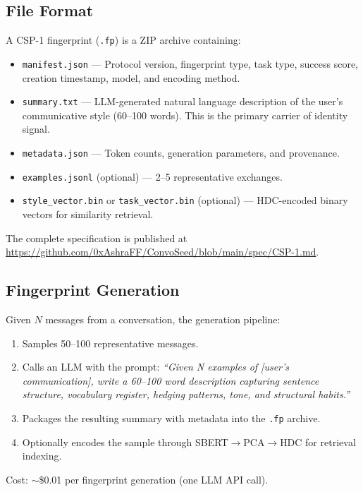 \documentclass[11pt,a4paper]{article}
\begin{document}
\subsection{File Format}

A CSP-1 fingerprint (\texttt{.fp}) is a ZIP archive containing:

\begin{itemize}[nosep]
  \item \texttt{manifest.json} --- Protocol version, fingerprint type, task type, success score, creation timestamp, model, and encoding method.
  \item \texttt{summary.txt} --- LLM-generated natural language description of the user's communicative style (60--100 words). This is the primary carrier of identity signal.
  \item \texttt{metadata.json} --- Token counts, generation parameters, and provenance.
  \item \texttt{examples.jsonl} (optional) --- 2--5 representative exchanges.
  \item \texttt{style\_vector.bin} or \texttt{task\_vector.bin} (optional) --- HDC-encoded binary vectors for similarity retrieval.
\end{itemize}

The complete specification is published at \url{https://github.com/0xAshraFF/ConvoSeed/blob/main/spec/CSP-1.md}.

\subsection{Fingerprint Generation}

Given $N$ messages from a conversation, the generation pipeline:

\begin{enumerate}[nosep]
  \item Samples 50--100 representative messages.
  \item Calls an LLM with the prompt: \textit{``Given N examples of [user's communication], write a 60--100 word description capturing sentence structure, vocabulary register, hedging patterns, tone, and structural habits.''}
  \item Packages the resulting summary with metadata into the \texttt{.fp} archive.
  \item Optionally encodes the sample through SBERT$\to$PCA$\to$HDC for retrieval indexing.
\end{enumerate}

Cost: $\sim$\$0.01 per fingerprint generation (one LLM API call).
\end{document}
